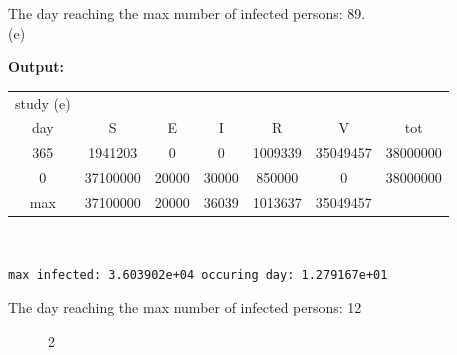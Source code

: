 \documentclass[12pt]{article}
\begin{document}
The day reaching the max number of infected persons: 89.\\

(e)

\textbf{Output:}

\begin{center}
\begin{tabular}{ c c c c c c c}
study (e)\\
day &  S    &      E    &      I    &      R    &      V    &    tot\\
365 &   1941203     &    0  &       0 &  1009339 & 35049457 &   38000000\\
0  & 37100000  &   20000    & 30000 &   850000  &       0  & 38000000\\
\hline
max  &   37100000  &   20000    & 36039 &  1013637 & 35049457\\
\end{tabular}
\end{center}\\

\begin{lstlisting}
max infected: 3.603902e+04 occuring day: 1.279167e+01
\end{lstlisting}
The day reaching the max number of infected persons: 12\\
\begin{figure}[H]
    \centering
    \qquad
    \caption{2 }
    \label{fig:example}
\end{figure}\\
\end{document}
